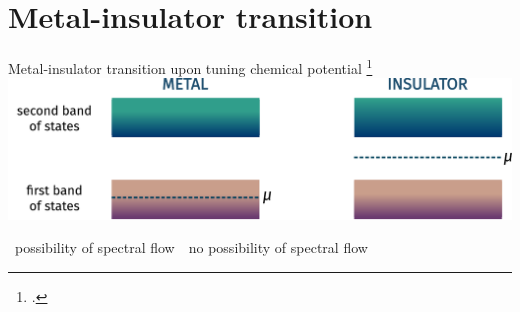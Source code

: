 \documentclass[aspectratio=169]{beamer}
\begin{document}
\section{Metal-insulator transition}

\begin{frame}{Metal-insulator transition upon tuning chemical potential}
\footcite{seki2017topological}
\includegraphics[width=\textwidth]{transition.pdf}

\vspace*{\fill}
\hspace*{\fill}~possibility of spectral flow~\hspace*{\fill}~no possibility of spectral flow
\end{frame}
\end{document}
